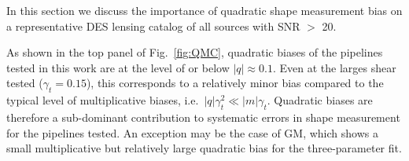 In this section we discuss the importance of quadratic shape measurement 
bias on a representative DES lensing catalog of 
all sources with SNR $>$ 20. 

 As shown in the top panel of Fig.~\ref{fig:QMC}, quadratic biases of the pipelines tested in this work are at the level of or below $|q|\approx0.1$. Even at the larges shear tested ($\gamma_t=0.15$), this corresponds to a relatively minor bias compared to the typical level of multiplicative biases, i.e.~$|q|\gamma_t^2\ll|m|\gamma_t$. Quadratic biases are therefore a sub-dominant contribution to systematic errors in shape measurement for the pipelines tested. An exception may be the case of GM, which shows a small multiplicative but relatively large quadratic bias for the three-parameter fit.

